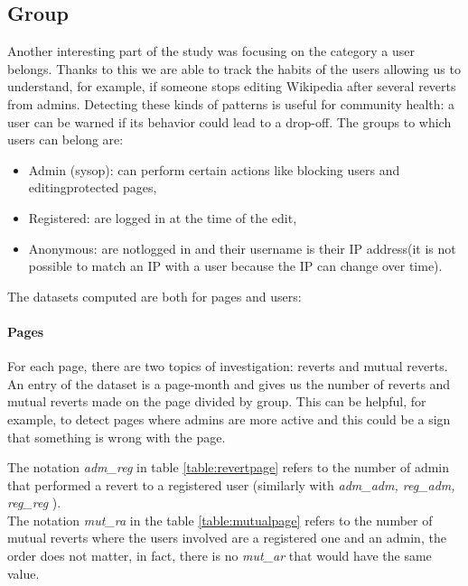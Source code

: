 \subsection{Group}
Another interesting part of the study was focusing on the category a user belongs. Thanks to this we
are able to track the habits of the users allowing us to understand, for example, if someone stops
editing Wikipedia after several reverts from admins. Detecting these kinds of patterns is useful for
community health: a user can be warned if its behavior could lead to a drop-off. The groups to which
users can belong are: 
\begin{itemize}
    \item Admin (sysop): can perform certain actions like blocking users and editingprotected pages, 
    \item Registered: are logged in at the time of the edit, 
    \item Anonymous: are notlogged in and their username is their IP address(it is not possible to match an IP with a user
        because the IP can change over time).
\end{itemize}

The datasets computed are both for pages and users: 
\paragraph*{Pages} 
For each page, there are two topics of investigation: reverts and mutual reverts. An entry of the
dataset is a page-month and gives us the number of reverts and mutual reverts made on the page
divided by group. This can be helpful, for example, to detect pages where admins are more active and
this could be a sign that something is wrong with the page.



The notation \textit{adm\_reg} in table \ref{table:revertpage} refers to the number of admin that performed a
revert to a registered user (similarly with \textit{adm\_adm, reg\_adm, reg\_reg} ).\\

The notation \textit{mut\_ra} in the table \ref{table:mutualpage} refers to the number of mutual reverts
where the users involved are a registered one and an admin, the order does not matter, in fact, there is
no \textit{mut\_ar} that would have the same value.\\


